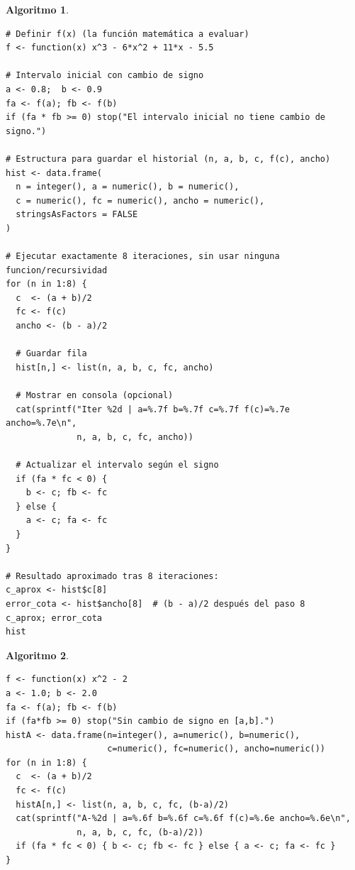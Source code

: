 \documentclass[12pt]{article}
\newtheorem{Algthm}{Algoritmo}
\begin{document}
\begin{Algthm}
\begin{verbatim}
# Definir f(x) (la función matemática a evaluar)
f <- function(x) x^3 - 6*x^2 + 11*x - 5.5

# Intervalo inicial con cambio de signo
a <- 0.8;  b <- 0.9
fa <- f(a); fb <- f(b)
if (fa * fb >= 0) stop("El intervalo inicial no tiene cambio de signo.")

# Estructura para guardar el historial (n, a, b, c, f(c), ancho)
hist <- data.frame(
  n = integer(), a = numeric(), b = numeric(),
  c = numeric(), fc = numeric(), ancho = numeric(),
  stringsAsFactors = FALSE
)

# Ejecutar exactamente 8 iteraciones, sin usar ninguna funcion/recursividad
for (n in 1:8) {
  c  <- (a + b)/2
  fc <- f(c)
  ancho <- (b - a)/2
  
  # Guardar fila
  hist[n,] <- list(n, a, b, c, fc, ancho)
  
  # Mostrar en consola (opcional)
  cat(sprintf("Iter %2d | a=%.7f b=%.7f c=%.7f f(c)=%.7e ancho=%.7e\n",
              n, a, b, c, fc, ancho))
  
  # Actualizar el intervalo según el signo
  if (fa * fc < 0) {
    b <- c; fb <- fc
  } else {
    a <- c; fa <- fc
  }
}

# Resultado aproximado tras 8 iteraciones:
c_aprox <- hist$c[8]
error_cota <- hist$ancho[8]  # (b - a)/2 después del paso 8
c_aprox; error_cota
hist
\end{verbatim}
\end{Algthm}

\begin{Algthm}
\begin{verbatim}
f <- function(x) x^2 - 2
a <- 1.0; b <- 2.0
fa <- f(a); fb <- f(b)
if (fa*fb >= 0) stop("Sin cambio de signo en [a,b].")
histA <- data.frame(n=integer(), a=numeric(), b=numeric(),
                    c=numeric(), fc=numeric(), ancho=numeric())
for (n in 1:8) {
  c  <- (a + b)/2
  fc <- f(c)
  histA[n,] <- list(n, a, b, c, fc, (b-a)/2)
  cat(sprintf("A-%2d | a=%.6f b=%.6f c=%.6f f(c)=%.6e ancho=%.6e\n",
              n, a, b, c, fc, (b-a)/2))
  if (fa * fc < 0) { b <- c; fb <- fc } else { a <- c; fa <- fc }
}
\end{verbatim}
\end{Algthm}
\end{document}
